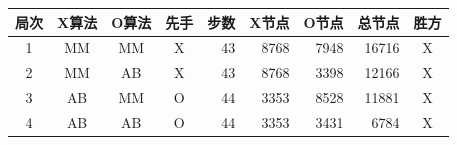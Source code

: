 \begin{tabular}{ccccrrrrc}
\toprule
局次 & X算法 & O算法 & 先手 & 步数 & X节点 & O节点 & 总节点 & 胜方 \\
\midrule
1 & MM & MM & X & 43 & 8768 & 7948 & 16716 & X \\
2 & MM & AB & X & 43 & 8768 & 3398 & 12166 & X \\
3 & AB & MM & O & 44 & 3353 & 8528 & 11881 & X \\
4 & AB & AB & O & 44 & 3353 & 3431 & 6784 & X \\
\bottomrule
\end{tabular}
